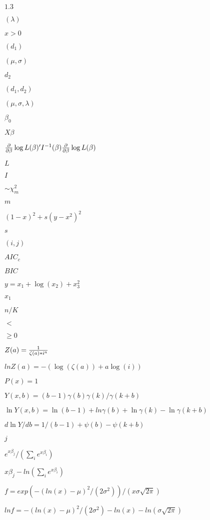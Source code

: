 \documentclass{article}
\begin{document}
$1.3$
\pagebreak

$(\lambda)$
\pagebreak

$x>0$
\pagebreak

$(d_1)$
\pagebreak

$(\mu, \sigma)$
\pagebreak

$d_2$
\pagebreak

$(d_1, d_2)$
\pagebreak

$(\mu, \sigma, \lambda)$
\pagebreak

$\beta_0$
\pagebreak

$X\beta$
\pagebreak

${\partial\over \partial\beta}\log L(\beta)'I^{-1}(\beta){\partial\over \partial\beta}\log L(\beta)$
\pagebreak

$L$
\pagebreak

$I$
\pagebreak

$\sim \chi^2_m$
\pagebreak

$m$
\pagebreak

$(1-x)^2+ s(y - x^2)^2$
\pagebreak

$s$
\pagebreak

$(i,j)$
\pagebreak

$AIC_c$
\pagebreak

$BIC$
\pagebreak

$y = x_1 + \log(x_2) + x_3^2$
\pagebreak

$x_1$
\pagebreak

$n/K$
\pagebreak

$<$
\pagebreak

$\geq 0$
\pagebreak

$Z(a) = {1\over \zeta(a) * i^a} $
\pagebreak

$lnZ(a) = -(\log(\zeta(a)) + a \log(i)) $
\pagebreak

$P(x) = 1$
\pagebreak

$ Y(x, b) = (b-1) \gamma(b) \gamma(k) / \gamma(k+b) $
\pagebreak

$ \ln Y(x, b) = \ln(b-1) + ln\gamma(b) + \ln\gamma(k) - \ln\gamma(k+b) $
\pagebreak

$ d\ln Y/db = 1/(b-1) + \psi(b) - \psi(k+b) $
\pagebreak

$j$
\pagebreak

$e^{x\beta_j}/ (\sum_i{e^{x\beta_i}})$
\pagebreak

$x\beta_j - ln(\sum_i{e^{x\beta_i}})$
\pagebreak

$f = exp(-(ln(x)-\mu)^2/(2\sigma^2))/ (x\sigma\sqrt{2\pi})$
\pagebreak

$ln f = -(ln(x)-\mu)^2/(2\sigma^2) - ln(x) - ln(\sigma\sqrt{2\pi})$
\pagebreak
\end{document}
